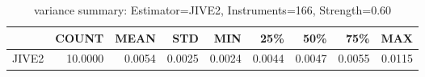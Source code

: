 \begin{table}[ht]
\centering
\caption{variance summary: Estimator=JIVE2, Instruments=166, Strength=0.60}
\begin{tabular}{lrrrrrrrr}
\toprule
 & COUNT & MEAN & STD & MIN & 25\% & 50\% & 75\% & MAX \\
\midrule
JIVE2 & 10.0000 & 0.0054 & 0.0025 & 0.0024 & 0.0044 & 0.0047 & 0.0055 & 0.0115 \\
\bottomrule
\end{tabular}
\end{table}

